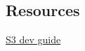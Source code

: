 





\subsection{Resources}\label{resources}

\href{https://docs.aws.amazon.com/s3/index.html}{S3 dev guide}



